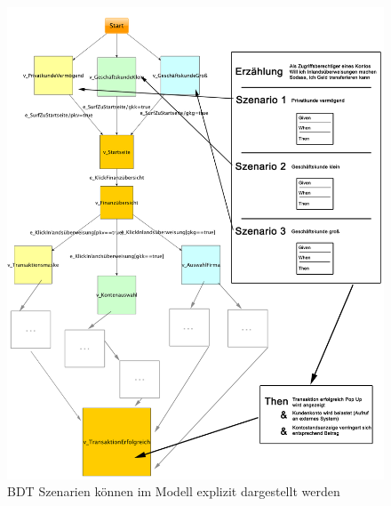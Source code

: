 \begin{figure}
\hspace*{-2cm}
  \centering
     \includegraphics[width=1.25\textwidth]{figures/mbt_bdt_gesamt.png}
  \caption{BDT Szenarien können im Modell explizit dargestellt werden}
  \label{fig:mbt_bdt_gesamt}
\end{figure}










